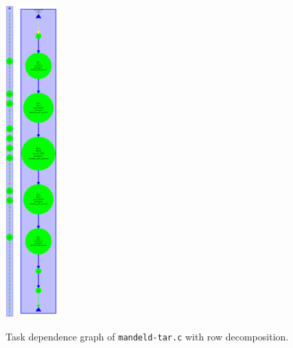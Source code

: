 \begin{figure}[H]
\centering
\includegraphics[height=12cm]{plots/dependency_graph_mandeld_point.png}
\includegraphics[height=12cm]{plots/dependency_graph_mandeld_row.png}
\caption{Task dependence graph of \texttt{mandeld-tar.c} with row decomposition.}
\label{graph:mandeld_row}
\end{figure}

